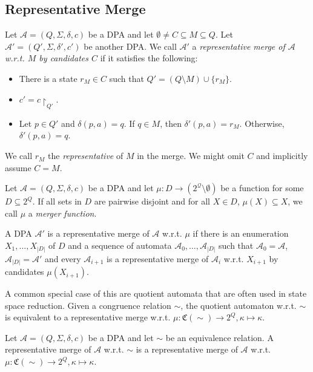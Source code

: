 \subsection{Representative Merge}

\begin{defn}
	Let $\mathcal{A} = (Q, \Sigma, \delta, c)$ be a DPA and let $\emptyset \neq C \subseteq M \subseteq Q$. Let $\mathcal{A}' = (Q', \Sigma, \delta', c')$ be another DPA. We call $\mathcal{A}'$ a \emph{representative merge of $\mathcal{A}$ w.r.t. $M$ by candidates $C$} if it satisfies the following:
	\begin{itemize}
		\item There is a state $r_M \in C$ such that $Q' = (Q \setminus M) \cup \{r_M\}$.
		\item $c' = c\upharpoonright_{Q'}$.
		\item Let $p \in Q'$ and $\delta(p, a) = q$. If $q \in M $, then $\delta'(p, a) = r_M$. Otherwise, $\delta'(p, a) = q$. 
	\end{itemize}
	
	We call $r_M$ the \emph{representative} of $M$ in the merge. We might omit $C$ and implicitly assume $C = M$.
\end{defn}

\begin{defn}
	Let $\mathcal{A} = (Q, \Sigma, \delta, c)$ be a DPA and let $\mu : D \rightarrow (2^\mathcal{Q} \setminus \emptyset)$ be a function for some $D \subseteq 2^Q$. If all sets in $D$ are pairwise disjoint and for all $X \in D$, $\mu(X) \subseteq X$, we call $\mu$ a \emph{merger function}. 
	
	A DPA $\mathcal{A}'$ is a representative merge of $\mathcal{A}$ w.r.t. $\mu$ if there is an enumeration $X_1, \dots, X_{|D|}$ of $D$ and a sequence of automata $\mathcal{A}_0, \dots, \mathcal{A}_{|D|}$ such that $\mathcal{A}_0 = \mathcal{A}$, $\mathcal{A}_{|D|} = \mathcal{A}'$ and every $\mathcal{A}_{i+1}$ is a representative merge of $\mathcal{A}_i$ w.r.t. $X_{i+1}$ by candidates $\mu(X_{i+1})$.
\end{defn}

A common special case of this are quotient automata that are often used in state space reduction. Given a congruence relation $\sim$, the quotient automaton w.r.t. $\sim$ is equivalent to a representative merge w.r.t. $\mu : \mathfrak{C}(\sim) \rightarrow 2^Q, \kappa \mapsto \kappa$.

\begin{lem}
	Let $\mathcal{A} = (Q, \Sigma, \delta, c)$ be a DPA and let $\sim$ be an equivalence relation. A representative merge of $\mathcal{A}$ w.r.t. $\sim$ is a representative merge of $\mathcal{A}$ w.r.t. $\mu : \mathfrak{C}(\sim) \rightarrow 2^Q, \kappa \mapsto \kappa$.
\end{lem}

